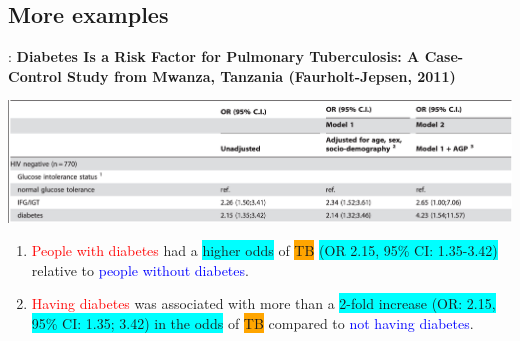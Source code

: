 \subsection{More examples}
\begin{frame}{\secname: \subsecname}
\footnotesize \textbf{Diabetes Is a Risk Factor for Pulmonary Tuberculosis: A Case-Control Study from Mwanza, Tanzania (Faurholt-Jepsen, 2011)}
\vspace{-3mm}
\begin{center}
\includegraphics[scale=0.35]{image/dm_tb.png}
\end{center}
\begin{enumerate}
    \item<2|handout:2-> \textcolor{red}{People with diabetes} had a \colorbox{cyan}{higher odds} of \colorbox{orange}{TB} \colorbox{cyan}{(OR 2.15, 95\% CI: 1.35-3.42)} relative to \textcolor{blue}{people without diabetes}.
    \item<3|handout:3> \textcolor{red}{Having diabetes} was associated with more than a \colorbox{cyan}{2-fold increase (OR: 2.15, 95\% CI: 1.35; 3.42) in the odds} of \colorbox{orange}{TB} compared to \textcolor{blue}{not having diabetes}.
\end{enumerate}
\end{frame}

